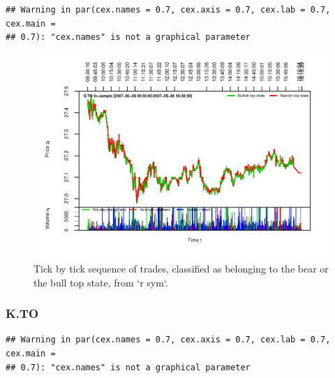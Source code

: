 \documentclass[]{article}
\begin{document}
\begin{verbatim}
## Warning in par(cex.names = 0.7, cex.axis = 0.7, cex.lab = 0.7, cex.main =
## 0.7): "cex.names" is not a graphical parameter
\end{verbatim}

\begin{figure}[H]
\includegraphics[width=\textwidth]{main_files/figure-latex/unnamed-chunk-34-1} \caption{Tick by tick sequence of trades, classified as belonging to the bear or the bull top state, from `r sym`.}\label{fig:unnamed-chunk-34}
\end{figure}

\newpage

\subsubsection{K.TO}\label{k.to}

\begin{verbatim}
## Warning in par(cex.names = 0.7, cex.axis = 0.7, cex.lab = 0.7, cex.main =
## 0.7): "cex.names" is not a graphical parameter
\end{verbatim}
\end{document}
